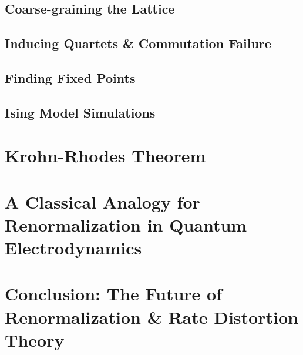 \documentclass[]{article}
\begin{document}
\subsection{Coarse-graining the Lattice}

\subsection{Inducing Quartets \& Commutation Failure}
\subsection{Finding Fixed Points}
\subsection{Ising Model Simulations}
\cite{kadanoff2000statistical,dedeo2012dynamics}

\section{Krohn-Rhodes Theorem}
\section{A Classical Analogy for Renormalization in Quantum Electrodynamics}
\section{Conclusion: The Future of Renormalization \& Rate Distortion Theory}




\end{document}
